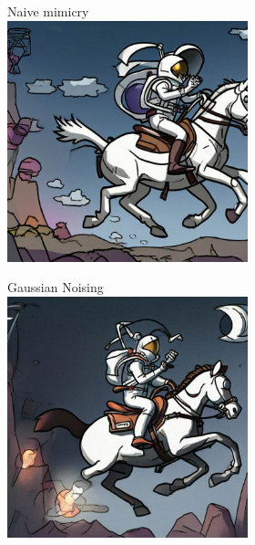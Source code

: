 \documentclass{article}
\begin{document}
\vspace{5em}
\begin{figure}[h]
    \centering
    \begin{subfigure}[t]{\textwidth}
        \begin{subfigure}[b]{0.19\textwidth}
         \centering
         Naive mimicry\vspace{0.3em}
         \includegraphics[width=\textwidth]{plots/process/generations/glaze/none.jpeg}
     \end{subfigure}
     \hfill
     \begin{subfigure}[b]{0.19\textwidth}
         \centering
         Gaussian Noising\vspace{0.3em}
         \includegraphics[width=\textwidth]{plots/process/generations/glaze/gaussian.jpeg}

\end{subfigure}
\end{subfigure}
\end{figure}
\end{document}
